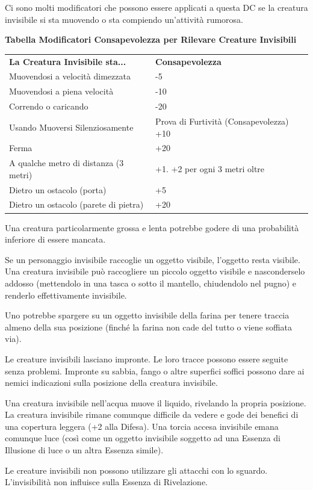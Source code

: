 \documentclass[a4paper,11pt,twoside,openany]{book}
\begin{document}
Ci sono molti modificatori che possono essere applicati a questa DC se la creatura invisibile si sta muovendo o sta compiendo un'attività rumorosa.

\bigskip

\textbf{Tabella Modificatori Consapevolezza per Rilevare Creature Invisibili}

\medskip

\begin{tabular}{ll}
\toprule
\textbf{La Creatura Invisibile sta...} & \textbf{Consapevolezza}\tabularnewline
Muovendosi a velocità dimezzata & -5\tabularnewline
Muovendosi a piena velocità & -10\tabularnewline
Correndo o caricando & -20\tabularnewline
Usando Muoversi Silenziosamente & Prova di Furtività (Consapevolezza) +10\tabularnewline
Ferma & +20\tabularnewline
A qualche metro di distanza (3 metri) & +1. +2 per ogni 3 metri oltre\tabularnewline
Dietro un ostacolo (porta) & +5\tabularnewline
Dietro un ostacolo (parete di pietra) & +20\tabularnewline

\end{tabular}

\bigskip

Una creatura particolarmente grossa e lenta potrebbe godere di una probabilità inferiore di essere mancata.

Se un personaggio invisibile raccoglie un oggetto visibile, l'oggetto resta visibile. Una creatura invisibile può raccogliere un piccolo oggetto visibile e nasconderselo addosso (mettendolo in una tasca o sotto il mantello, chiudendolo nel pugno) e renderlo effettivamente invisibile.

Uno potrebbe spargere su un oggetto invisibile della farina per tenere traccia almeno della sua posizione (finché la farina non cade del tutto o viene soffiata via).

Le creature invisibili lasciano impronte. Le loro tracce possono essere seguite senza problemi. Impronte su sabbia, fango o altre superfici soffici possono dare ai nemici indicazioni sulla posizione della creatura invisibile.

Una creatura invisibile nell'acqua muove il liquido, rivelando la propria posizione. La creatura invisibile rimane comunque difficile da vedere e gode dei benefici di una copertura leggera (+2 alla Difesa). 
Una torcia accesa invisibile emana comunque luce (così come un oggetto invisibile soggetto ad una Essenza di Illusione di luce o un altra Essenza simile).

Le creature invisibili non possono utilizzare gli attacchi con lo sguardo. L'invisibilità non influisce sulla Essenza di Rivelazione.
\end{document}
